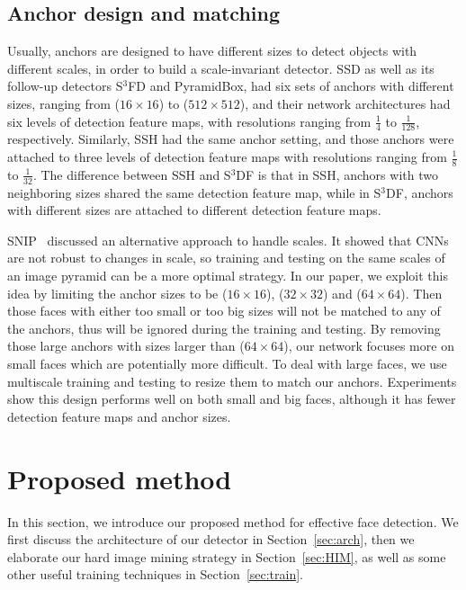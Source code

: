 \documentclass[10pt,twocolumn,letterpaper]{article}
\begin{document}
\subsection{Anchor design and matching}
Usually, anchors are designed to have different sizes to detect objects with different
scales, in order to build a scale-invariant detector. SSD as well as its follow-up detectors S$^3$FD and PyramidBox,
had six sets of anchors with different
sizes, ranging from ($16\times16$) to ($512\times 512$), and their network architectures had six levels
of detection feature maps, with resolutions ranging from $\frac{1}{4}$ to $\frac{1}{128}$,
respectively. Similarly, SSH had the same anchor setting, and those anchors were
attached to three levels of detection
feature maps with resolutions ranging from $\frac{1}{8}$ to $\frac{1}{32}$. The difference
between SSH and S$^3$DF is that in SSH, anchors with two neighboring sizes shared the same
detection feature map, while in S$^3$DF, anchors with different sizes are attached to
different detection feature maps.

SNIP~\cite{Singh2017AnAO} discussed an alternative approach to handle scales. It
showed that CNNs are not robust to changes in scale, so training and testing on the same
scales of an image pyramid can be a more optimal strategy. In our paper, we exploit
this idea by limiting the anchor sizes to be ($16\times 16$), ($32\times 32$) and ($64\times 64$).
Then those faces with either too small or too big sizes will not be matched to any of the anchors, thus
will be ignored during the training and testing. By removing those large anchors with sizes larger than
($64\times 64$), our network focuses more on small faces which are potentially more difficult.
To deal with large faces, we use multiscale training
and testing to resize them to match our anchors.
Experiments show this design performs well on both small and big faces, although it
has fewer detection feature maps and anchor sizes.


\section{Proposed method}\label{sec:method}
In this section, we introduce our proposed method for effective face
detection. We first discuss the architecture of our detector in Section~\ref{sec:arch},
then we elaborate our hard image mining strategy in Section~\ref{sec:HIM}, as well as some other useful training techniques in Section~\ref{sec:train}.
\end{document}
